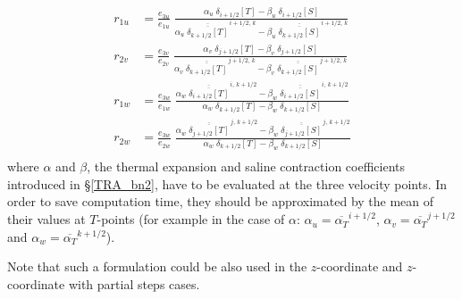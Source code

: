 \documentclass[NEMO_book]{subfiles}
\begin{document}
\begin{description}
\begin{equation} \label{Eq_ldfslp_iso2}
\begin{split}
 r_{1u} &= \frac{e_{3u}}{e_{1u}}\; \frac
 		{\alpha_u \;\delta_{i+1/2}[T] - \beta_u \;\delta_{i+1/2}[S]}
		{\alpha_u \;\overline{\overline{\delta_{k+1/2}[T]}}^{\,i+1/2,\,k}
		 -\beta_u  \;\overline{\overline{\delta_{k+1/2}[S]}}^{\,i+1/2,\,k} }
\\
 r_{2v} &= \frac{e_{3v}}{e_{2v}}\; \frac
 		{\alpha_v \;\delta_{j+1/2}[T] - \beta_v \;\delta_{j+1/2}[S]}
		{\alpha_v \;\overline{\overline{\delta_{k+1/2}[T]}}^{\,j+1/2,\,k}
		 -\beta_v  \;\overline{\overline{\delta_{k+1/2}[S]}}^{\,j+1/2,\,k} }
\\
 r_{1w} &= \frac{e_{3w}}{e_{1w}}\; \frac
		{\alpha_w \;\overline{\overline{\delta_{i+1/2}[T]}}^{\,i,\,k+1/2}
		 -\beta_w  \;\overline{\overline{\delta_{i+1/2}[S]}}^{\,i,\,k+1/2} }
 		{\alpha_w \;\delta_{k+1/2}[T] - \beta_w \;\delta_{k+1/2}[S]}
\\
 r_{2w} &= \frac{e_{3w}}{e_{2w}}\; \frac
		{\alpha_w \;\overline{\overline{\delta_{j+1/2}[T]}}^{\,j,\,k+1/2}
		 -\beta_w  \;\overline{\overline{\delta_{j+1/2}[S]}}^{\,j,\,k+1/2} }
 		{\alpha_w \;\delta_{k+1/2}[T] - \beta_w \;\delta_{k+1/2}[S]}
\\
\end{split}
\end{equation}
where $\alpha$ and $\beta$, the thermal expansion and saline contraction 
coefficients introduced in \S\ref{TRA_bn2}, have to be evaluated at the three 
velocity points. In order to save computation time, they should be approximated 
by the mean of their values at $T$-points (for example in the case of $\alpha$:  
$\alpha_u=\overline{\alpha_T}^{i+1/2}$,  $\alpha_v=\overline{\alpha_T}^{j+1/2}$ 
and $\alpha_w=\overline{\alpha_T}^{k+1/2}$).

Note that such a formulation could be also used in the $z$-coordinate and 
$z$-coordinate with partial steps cases.

\end{description}
\end{document}
